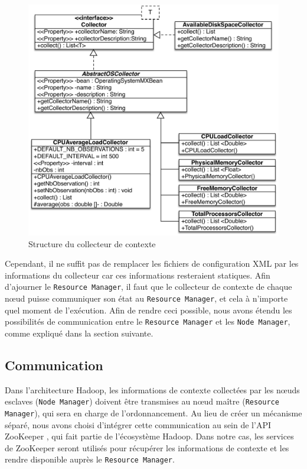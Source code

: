 \begin{figure}[!ht]
	\centering
	\includegraphics[width=0.75\linewidth]{img/CollectorUML2.pdf}
	\caption{Structure du collecteur de contexte}
	\label{fig:CollectorDiag}
\end{figure}

Cependant, il ne suffit pas de remplacer les fichiers de configuration XML par les informations du collecteur car ces informations resteraient statiques. Afin d'ajourner le \texttt{Resource Manager}, il faut que le collecteur de contexte de chaque n{\oe}ud puisse communiquer son état au \texttt{Resource Manager}, et cela à n'importe quel moment de l'exécution. Afin de rendre ceci possible, nous avons étendu les possibilités de communication entre le \texttt{Resource Manager} et les \texttt{Node Manager}, comme expliqué dans la section suivante.    

\subsection{Communication}
Dans l'architecture Hadoop, les informations de contexte collectées par les n{\oe}uds esclaves (\texttt{Node Manager}) doivent être transmises au n{\oe}ud maître (\texttt{Resource Manager}), qui sera en charge de l'ordonnancement. Au lieu de créer un mécanisme séparé, nous avons choisi d'intégrer cette communication au sein de l'API ZooKeeper \cite{Hunt2010}, qui fait partie de l'écosystème Hadoop. Dans notre cas, les services de ZooKeeper seront utilisés pour récupérer les informations de contexte et les rendre disponible auprès le \texttt{Resource Manager}. 

